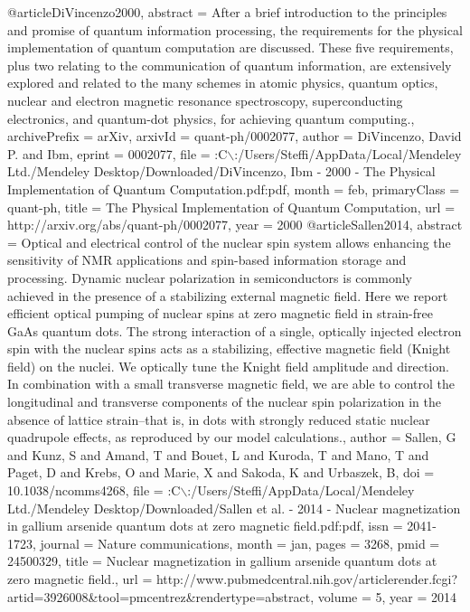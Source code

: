 @article{DiVincenzo2000,
abstract = {After a brief introduction to the principles and promise of quantum information processing, the requirements for the physical implementation of quantum computation are discussed. These five requirements, plus two relating to the communication of quantum information, are extensively explored and related to the many schemes in atomic physics, quantum optics, nuclear and electron magnetic resonance spectroscopy, superconducting electronics, and quantum-dot physics, for achieving quantum computing.},
archivePrefix = {arXiv},
arxivId = {quant-ph/0002077},
author = {DiVincenzo, David P. and Ibm},
eprint = {0002077},
file = {:C$\backslash$:/Users/Steffi/AppData/Local/Mendeley Ltd./Mendeley Desktop/Downloaded/DiVincenzo, Ibm - 2000 - The Physical Implementation of Quantum Computation.pdf:pdf},
month = {feb},
primaryClass = {quant-ph},
title = {{The Physical Implementation of Quantum Computation}},
url = {http://arxiv.org/abs/quant-ph/0002077},
year = {2000}
}
@article{Sallen2014,
abstract = {Optical and electrical control of the nuclear spin system allows enhancing the sensitivity of NMR applications and spin-based information storage and processing. Dynamic nuclear polarization in semiconductors is commonly achieved in the presence of a stabilizing external magnetic field. Here we report efficient optical pumping of nuclear spins at zero magnetic field in strain-free GaAs quantum dots. The strong interaction of a single, optically injected electron spin with the nuclear spins acts as a stabilizing, effective magnetic field (Knight field) on the nuclei. We optically tune the Knight field amplitude and direction. In combination with a small transverse magnetic field, we are able to control the longitudinal and transverse components of the nuclear spin polarization in the absence of lattice strain--that is, in dots with strongly reduced static nuclear quadrupole effects, as reproduced by our model calculations.},
author = {Sallen, G and Kunz, S and Amand, T and Bouet, L and Kuroda, T and Mano, T and Paget, D and Krebs, O and Marie, X and Sakoda, K and Urbaszek, B},
doi = {10.1038/ncomms4268},
file = {:C$\backslash$:/Users/Steffi/AppData/Local/Mendeley Ltd./Mendeley Desktop/Downloaded/Sallen et al. - 2014 - Nuclear magnetization in gallium arsenide quantum dots at zero magnetic field.pdf:pdf},
issn = {2041-1723},
journal = {Nature communications},
month = {jan},
pages = {3268},
pmid = {24500329},
title = {{Nuclear magnetization in gallium arsenide quantum dots at zero magnetic field.}},
url = {http://www.pubmedcentral.nih.gov/articlerender.fcgi?artid=3926008{\&}tool=pmcentrez{\&}rendertype=abstract},
volume = {5},
year = {2014}
}
